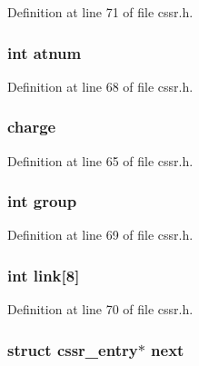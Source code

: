 Definition at line 71 of file cssr.\-h.

\hypertarget{structcssr__entry_af0f05b6c256a3631c9735a45190bc2ae}{
\subsubsection[{atnum}]{\setlength{\rightskip}{0pt plus 5cm}int atnum}}\label{structcssr__entry_af0f05b6c256a3631c9735a45190bc2ae}


Definition at line 68 of file cssr.\-h.

\hypertarget{structcssr__entry_afac660f5fc888ec4f05d43405a86779f}{
\subsubsection[{charge}]{ charge}}\label{structcssr__entry_afac660f5fc888ec4f05d43405a86779f}


Definition at line 65 of file cssr.\-h.

\hypertarget{structcssr__entry_a0242027ec3331f3d5793c42d21b6f4e1}{
\subsubsection[{group}]{\setlength{\rightskip}{0pt plus 5cm}int group}}\label{structcssr__entry_a0242027ec3331f3d5793c42d21b6f4e1}


Definition at line 69 of file cssr.\-h.

\hypertarget{structcssr__entry_a5867ebf64ca08d83b72b4da8dd68a0ee}{
\subsubsection[{link}]{\setlength{\rightskip}{0pt plus 5cm}int link\mbox{[}8\mbox{]}}}\label{structcssr__entry_a5867ebf64ca08d83b72b4da8dd68a0ee}


Definition at line 70 of file cssr.\-h.

\hypertarget{structcssr__entry_a1c51d4be3e96a81f4762fb2c3a4bacad}{
\subsubsection[{next}]{\setlength{\rightskip}{0pt plus 5cm}struct {\bf cssr\-\_\-entry}$\ast$ next}}\label{structcssr__entry_a1c51d4be3e96a81f4762fb2c3a4bacad}


